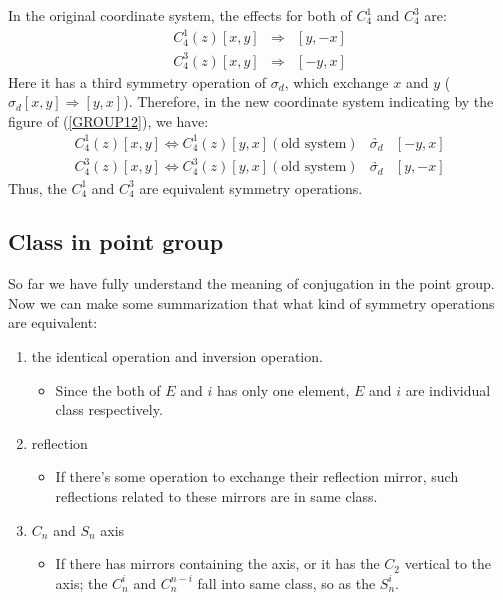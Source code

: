 In the original coordinate system, the effects for both of $C^{1}_{4}$
and $C^{3}_{4}$ are:
\begin{eqnarray}
  C^{1}_{4}(z)[x,y] &\Rightarrow& [y,-x] \nonumber \\
  C^{3}_{4}(z)[x,y] &\Rightarrow& [-y,x]
\end{eqnarray}
Here it has a third symmetry operation of $\sigma_{d}$, which exchange
$x$ and $y$ ($\sigma_{d}[x,y] \Rightarrow [y,x]$).  Therefore, in the
new coordinate system indicating by the figure of (\ref{GROUP12}), we
have:
\begin{eqnarray}
  C^{1}_{4}(z)[x,y] \Leftrightarrow C^{1}_{4}(z)[y,x] (\text{old system})
  &\underrightarrow{\sigma_{d}}& [-y,x] \nonumber \\
  C^{3}_{4}(z)[x,y] \Leftrightarrow C^{3}_{4}(z)[y,x] (\text{old system})
  &\underrightarrow{\sigma_{d}}& [y,-x]
\end{eqnarray}
Thus, the $C^{1}_{4}$ and $C^{3}_{4}$ are equivalent symmetry
operations.

\subsection{Class in point group}
%
%
So far we have fully understand the meaning of conjugation in the
point group. Now we can make some summarization that what kind of
symmetry operations are equivalent:

\begin{enumerate}
\item the identical operation and inversion operation.
  \begin{itemize}
  \item Since the both of $E$ and $i$ has only one element, $E$ and
    $i$ are individual class respectively.
  \end{itemize}
\item reflection
  \begin{itemize}
  \item If there's some operation to exchange their reflection mirror,
    such reflections related to these mirrors are in same class.
  \end{itemize}
\item $C_{n}$ and $S_{n}$ axis
  \begin{itemize}
  \item If there has mirrors containing the axis, or it has the
    $C_{2}$ vertical to the axis; the $C^{i}_{n}$ and $C^{n-i}_{n}$
    fall into same class, so as the $S^{i}_{n}$.
  \end{itemize}
\end{enumerate}


